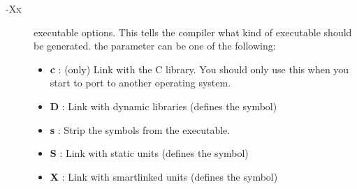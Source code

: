 \documentclass{book}
\begin{document}
\begin{description}
\item [-Xx]  executable options. This tells the compiler what
kind of executable should be generated. the parameter 
can be one of the following:
\begin{itemize}
\item \textbf{c} : (\linux only) Link with the C library. You should only use this when
  you start to port \fpc to another operating system.
\item \textbf{D} : Link with dynamic libraries (defines the
 symbol)
\item \textbf{s} : Strip the symbols from the executable.
\item \textbf{S} : Link with static units (defines the  symbol)
\item \textbf{X} : Link with smartlinked units (defines the
 symbol)
\end{itemize}
\end{description}

%
%

\end{document}
